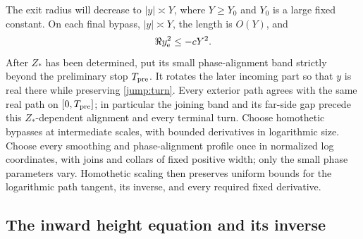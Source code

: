 The exit radius will decrease to $|y|\asymp Y$, where $Y\geq Y_0$ and
$Y_0$ is a large fixed constant.  On each final bypass, $|y|\asymp Y$,
the length is $O(Y)$, and
\begin{equation}\label{jump:negative-exit}
 \Re y_{\rm e}^{2}\leq-cY^2.
\end{equation}
After $Z_*$ has been determined, put its small phase-alignment band
strictly beyond the preliminary stop $T_{\rm pre}$.  It rotates the
later incoming part so that $y$ is real there while preserving
\eqref{jump:turn}.  Every exterior path agrees with the same real
path on $[0,T_{\rm pre}]$; in particular the joining band and its
far-side gap precede this $Z_*$-dependent alignment and every terminal
turn.  Choose homothetic bypasses at intermediate scales, with bounded
derivatives in logarithmic size.  Choose every smoothing and phase-alignment
profile once in normalized log coordinates, with joins and collars of fixed
positive width; only the small phase parameters vary.  Homothetic scaling
then preserves uniform bounds for the logarithmic path tangent, its inverse,
and every required fixed derivative.

\subsection{The inward height equation and its inverse}

